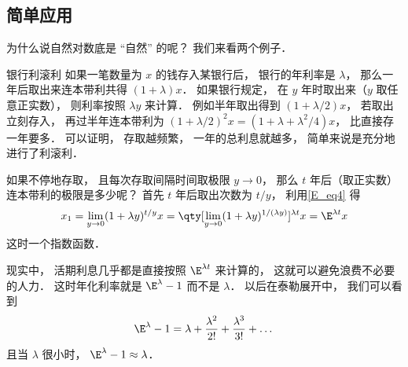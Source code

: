\subsection{简单应用}
为什么说自然对数底是 “自然” 的呢？ 我们来看两个例子．

\begin{example}{银行利滚利}
如果一笔数量为 $x$ 的钱存入某银行后， 银行的年利率是 $\lambda$， 那么一年后取出来连本带利共得 $(1+\lambda)x$． 如果银行规定， 在 $y$ 年时取出来（$y$ 取任意正实数）， 则利率按照 $\lambda y$ 来计算． 例如半年取出得到 $(1+\lambda/2)x$， 若取出立刻存入， 再过半年连本带利为 $(1+\lambda/2)^2 x = (1 + \lambda + \lambda^2/4)x$， 比直接存一年要多． 可以证明， 存取越频繁， 一年的总利息就越多， 简单来说是充分地进行了利滚利．

如果不停地存取， 且每次存取间隔时间取极限 $y \to 0$， 那么 $t$ 年后（取正实数）连本带利的极限是多少呢？ 首先 $t$ 年后取出次数为 $t/y$， 利用\autoref{E_eq4} 得
\begin{equation}
x_1 = \lim_{y\to 0}(1 + \lambda y)^{t/y} x
= \qty[\lim_{y\to 0}(1 + \lambda y)^{1/(\lambda y)}]^{\lambda t} x
= \E^{\lambda t} x
\end{equation}
这时一个指数函数．

现实中， 活期利息几乎都是直接按照 $\E^{\lambda t}$ 来计算的， 这就可以避免浪费不必要的人力． 这时年化利率就是 $\E^\lambda - 1$ 而不是 $\lambda$． 以后在泰勒展开中， 我们可以看到
\begin{equation}
\E^\lambda - 1 = \lambda + \frac{\lambda^2}{2!} + \frac{\lambda^3}{3!} + \dots
\end{equation}
且当 $\lambda$ 很小时， $\E^\lambda - 1 \approx \lambda$．
\end{example}

